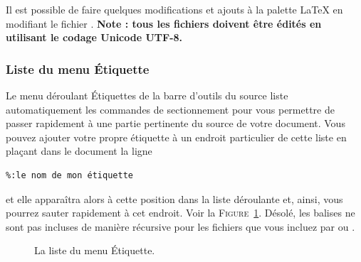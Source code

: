 \documentclass[11pt,french]{article}
\newcommand{\mnu}[1]{\textsf{#1}}
\begin{document}
Il est possible de faire quelques modifications et ajouts à la palette LaTeX  en modifiant le fichier . \textbf{Note : tous les fichiers  doivent être édités en utilisant le codage Unicode UTF-8.}


\subsubsection{Liste du menu Étiquette}

Le menu déroulant \mnu{Étiquettes} de la barre d'outils du source liste automatiquement les commandes de sectionnement pour vous permettre de passer rapidement à une partie pertinente du source de votre document. Vous pouvez ajouter votre propre étiquette à un endroit particulier de cette liste en plaçant dans le document la ligne
\begin{verbatim}
%:le nom de mon étiquette
\end{verbatim}
et elle apparaîtra alors à cette position dans la liste déroulante et, ainsi, vous pourrez sauter rapidement à cet endroit. Voir la \textsc{Figure}~\ref{fig:Tags}. Désolé, les balises ne sont pas incluses de manière récursive pour les fichiers que vous incluez par \verb|| ou \verb||.

\begin{figure}
\centering
{}
\caption{La liste du menu Étiquette.}
\label{fig:Tags}
\end{figure}
\end{document}
